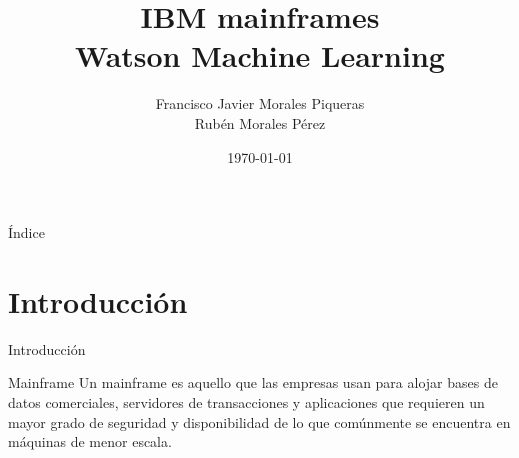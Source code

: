 \documentclass[compress]{beamer}
\title{IBM mainframes \\ Watson Machine Learning}
\author{Francisco Javier Morales Piqueras \\ Rubén Morales Pérez}
\date{\today}
\begin{document}
\begin{frame}
\titlepage
\end{frame}
\begin{frame}{Índice}
	\hypertarget{index}{}
	\tableofcontents
\end{frame}

\section{Introducción}
\begin{frame}{Introducción}
	\begin{block}{Mainframe}
		Un mainframe es aquello que las empresas usan para alojar bases de datos comerciales, servidores de transacciones y aplicaciones que requieren un mayor grado de seguridad y disponibilidad de lo que comúnmente se encuentra en máquinas de menor escala.
	\end{block}


\end{frame}
\end{document}
